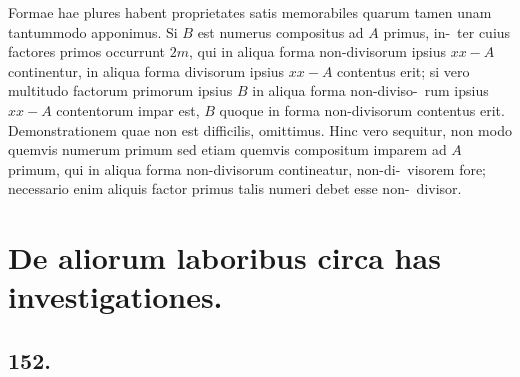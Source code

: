 \documentclass[12pt,a4paper]{article}
\theoremstyle{plain}
\theoremstyle{definition}
\theoremstyle{remark}
\begin{document}
Formae hae plures habent proprietates satis memorabiles quarum tamen
unam tantummodo apponimus. Si $B$ est numerus compositus ad $A$ primus, in-\ ter cuius factores primos occurrunt $2m$, qui in aliqua forma non-divisorum ipsius
$xx - A$ continentur, in aliqua forma divisorum ipsius $xx - A$ contentus
erit; si vero multitudo factorum primorum ipsius $B$ in aliqua forma non-diviso-\ rum ipsius $xx - A$ contentorum impar est, $B$ quoque in forma non-divisorum
contentus erit. Demonstrationem quae non est difficilis, omittimus. Hinc vero
sequitur, non modo quemvis numerum primum sed etiam quemvis compositum
imparem ad $A$ primum, qui in aliqua forma non-divisorum contineatur, non-di-\ visorem fore; necessario enim aliquis factor primus talis numeri debet esse non-\ divisor.

\section*{De aliorum laboribus circa has investigationes.}

\subsection*{152.}
\end{document}
